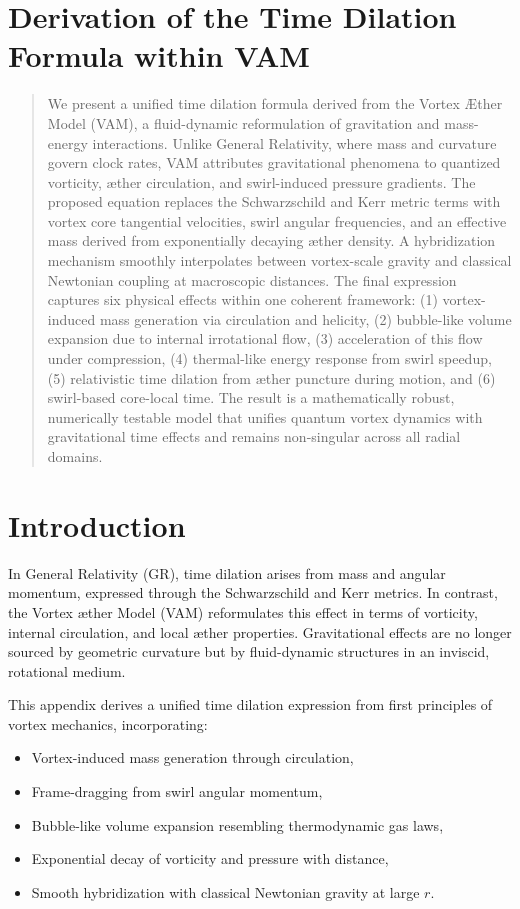 \section{Derivation of the Time Dilation Formula within VAM}
\label{sec:appendix:1}

\begin{abstract}
    We present a unified time dilation formula derived from the Vortex \AE{}ther Model (VAM), a fluid-dynamic reformulation of gravitation and mass-energy interactions. Unlike General Relativity, where mass and curvature govern clock rates, VAM attributes gravitational phenomena to quantized vorticity, \ae{}ther circulation, and swirl-induced pressure gradients. The proposed equation replaces the Schwarzschild and Kerr metric terms with vortex core tangential velocities, swirl angular frequencies, and an effective mass derived from exponentially decaying \ae{}ther density. A hybridization mechanism smoothly interpolates between vortex-scale gravity and classical Newtonian coupling at macroscopic distances. The final expression captures six physical effects within one coherent framework: (1) vortex-induced mass generation via circulation and helicity, (2) bubble-like volume expansion due to internal irrotational flow, (3) acceleration of this flow under compression, (4) thermal-like energy response from swirl speedup, (5) relativistic time dilation from \ae{}ther puncture during motion, and (6) swirl-based core-local time. The result is a mathematically robust, numerically testable model that unifies quantum vortex dynamics with gravitational time effects and remains non-singular across all radial domains.
\end{abstract}

\section*{Introduction}
In General Relativity (GR), time dilation arises from mass and angular momentum, expressed through the Schwarzschild and Kerr metrics. In contrast, the Vortex \ae{}ther Model (VAM) reformulates this effect in terms of vorticity, internal circulation, and local \ae{}ther properties. Gravitational effects are no longer sourced by geometric curvature but by fluid-dynamic structures in an inviscid, rotational medium.

This appendix derives a unified time dilation expression from first principles of vortex mechanics, incorporating:

\begin{itemize}
    \item Vortex-induced mass generation through circulation,
    \item Frame-dragging from swirl angular momentum,
    \item Bubble-like volume expansion resembling thermodynamic gas laws,
    \item Exponential decay of vorticity and pressure with distance,
    \item Smooth hybridization with classical Newtonian gravity at large $r$.
\end{itemize}


